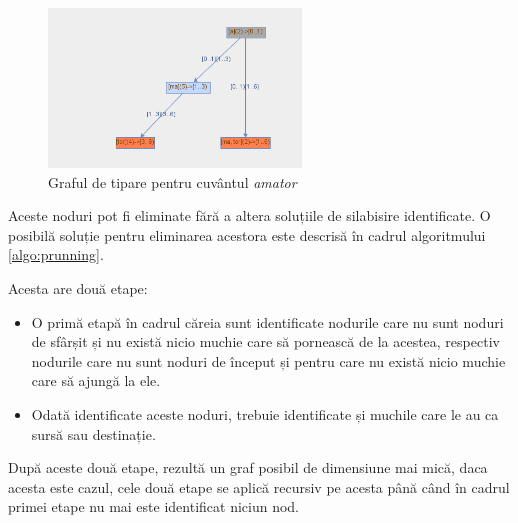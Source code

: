 \begin{figure}[h!]
    \centering
    \includegraphics[width=0.6\textwidth]{figures/rosil-amator-prunned.png}
    \caption{Graful de tipare pentru cuvântul \textit{amator}}
    \label{fig:rosil-amator-prunned}
\end{figure}

Aceste noduri pot fi eliminate fără a altera soluțiile de silabisire identificate. O posibilă soluție pentru eliminarea acestora este descrisă în cadrul algoritmului \ref{algo:prunning}. 

Acesta are două etape: 
\begin{itemize}
\item O primă etapă în cadrul căreia sunt identificate nodurile care nu sunt noduri de sfârșit și nu există nicio muchie care să pornească de la acestea, respectiv nodurile care nu sunt noduri de început și pentru care nu există nicio muchie care să ajungă la ele.
\item Odată identificate aceste noduri, trebuie identificate și muchile care le au ca sursă sau destinație.
\end{itemize}
După aceste două etape, rezultă un graf posibil de dimensiune mai mică, daca acesta este cazul, cele două etape se aplică recursiv pe acesta până când în cadrul primei etape nu mai este identificat niciun nod. 

